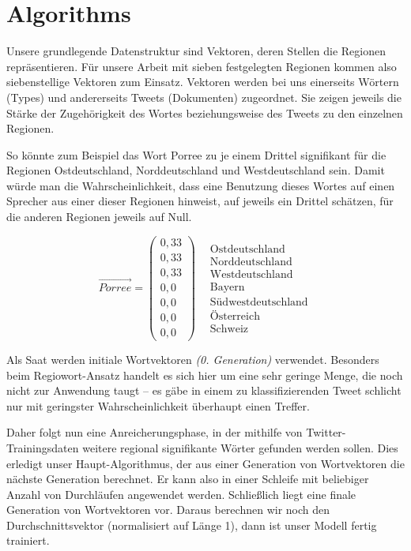 \documentclass[../Main.tex]{subfiles}
\begin{document}
\section{Algorithms}
Unsere grundlegende Datenstruktur sind Vektoren, deren Stellen die Regionen repräsentieren. Für unsere Arbeit mit sieben festgelegten Regionen kommen also siebenstellige Vektoren zum Einsatz.
Vektoren werden bei uns einerseits Wörtern (Types) und andererseits Tweets (Dokumenten) zugeordnet. Sie zeigen jeweils die Stärke der Zugehörigkeit des Wortes beziehungsweise des Tweets zu den einzelnen Regionen.

So könnte zum Beispiel das Wort \glqq Porree\grqq{} zu je einem Drittel signifikant für die Regionen Ostdeutschland, Norddeutschland und Westdeutschland sein. Damit würde man die Wahrscheinlichkeit, dass eine Benutzung dieses Wortes auf einen Sprecher aus einer dieser Regionen hinweist, auf jeweils ein Drittel schätzen, für die anderen Regionen jeweils auf Null.

$$\overrightarrow{Porree} = \begin{pmatrix} 0,33 \\ 0,33 \\ 0,33 \\ 0,0 \\ 0,0 \\ 0,0 \\ 0,0 \end{pmatrix} \ \ \ \ \begin{matrix} \text{Ostdeutschland} \\ \text{Norddeutschland} \\ \text{Westdeutschland} \\ \text{Bayern} \\ \text{Südwestdeutschland} \\ \text{Österreich} \\ \text{Schweiz} \end{matrix}$$

Als Saat werden initiale Wortvektoren \textit{(0. Generation)} verwendet. Besonders beim Regiowort-Ansatz handelt es sich hier um eine sehr geringe Menge, die noch nicht zur Anwendung taugt -- es gäbe in einem zu klassifizierenden Tweet schlicht nur mit geringster Wahrscheinlichkeit überhaupt einen Treffer.

Daher folgt nun eine Anreicherungsphase, in der mithilfe von Twitter-Trainingsdaten weitere regional signifikante Wörter gefunden werden sollen. Dies erledigt unser Haupt-Algorithmus, der aus einer Generation von Wortvektoren die nächste Generation berechnet. Er kann also in einer Schleife mit beliebiger Anzahl von Durchläufen angewendet werden. Schließlich liegt eine finale Generation von Wortvektoren vor. Daraus berechnen wir noch den Durchschnittsvektor (normalisiert auf Länge 1), dann ist unser Modell fertig trainiert.
\end{document}

